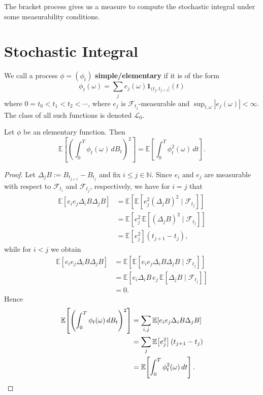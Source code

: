 The bracket process gives us a measure to compute the stochastic integral under some measurability conditions. 


\section{Stochastic Integral}
\begin{definition}
	We call a process $\phi = (\phi_t)$ \textbf{simple/elementary} if it is of the form
	\begin{equation*}
		\phi_t(\omega) = \sum_j e_j(\omega) \mathbf{1}_{(t_j, t_{j+1}]}(t)
	\end{equation*}
	where $0 = t_0 < t_1 < t_2 < \cdots$, where $e_j$ is $\mathcal{F}_{t_j}$-measurable and $\sup_{t,\omega} |e_j(\omega)| < \infty$. The class of all such functions is denoted $\mathcal{L}_0$.
\end{definition}

\begin{lemma}[It\^{o} Isometry]
	Let $\phi$ be an elementary function. Then
	\begin{equation*}
		\mathbb{E}\left[\left(\int_0^T \phi_t(\omega)\, dB_t\right)^2\right] = \mathbb{E}\left[\int_0^T \phi_t^2(\omega)\, dt\right].
	\end{equation*}
\end{lemma}
\begin{proof}
	Let $\Delta_j B := B_{t_{j+1}} - B_{t_j}$ and fix $i \leq j \in \mathbb{N}$. Since $e_i$ and $e_j$ are measurable with respect to $\mathcal{F}_{t_i}$ and $\mathcal{F}_{t_j}$, respectively, we have for $i = j$ that
	\begin{align*}
		\mathbb{E}[e_i e_j \Delta_i B \Delta_j B]
		&= \mathbb{E}\!\left[\mathbb{E}\!\left[e_j^2 (\Delta_j B)^2 \mid \mathcal{F}_{t_j}\right]\right] \\
		&= \mathbb{E}\!\left[e_j^2\, \mathbb{E}\!\left[(\Delta_j B)^2 \mid \mathcal{F}_{t_j}\right]\right] \\
		&= \mathbb{E}\!\left[e_j^2\right](t_{j+1} - t_j),
	\end{align*}
	while for $i < j$ we obtain
	\begin{align*}
		\mathbb{E}[e_i e_j \Delta_i B \Delta_j B]
		&= \mathbb{E}\!\left[\mathbb{E}\!\left[e_i e_j \Delta_i B \Delta_j B \mid \mathcal{F}_{t_j}\right]\right] \\
		&= \mathbb{E}\!\left[e_i \Delta_i B\, e_j\, \mathbb{E}\!\left[\Delta_j B \mid \mathcal{F}_{t_j}\right]\right] \\
		&= 0.
	\end{align*}
	Hence
	\begin{align*}
		\mathbb{E}\!\left[\left(\int_0^T \phi_t(\omega)\, dB_t\right)^2\right]
		&= \sum_{i,j} \mathbb{E}[e_i e_j \Delta_i B \Delta_j B] \\
		&= \sum_j \mathbb{E}\!\left[e_j^2\right](t_{j+1} - t_j) \\
		&= \mathbb{E}\!\left[\int_0^T \phi_t^2(\omega)\, dt\right]. \qedhere
	\end{align*}
\end{proof}


